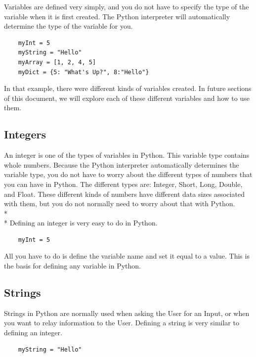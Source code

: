 \documentclass[12pt, letterpaper]{article}
\begin{document}
    Variables are defined very simply, and you do not have to specify the type of the variable when it is first created. The Python interpreter will automatically determine the type of the variable for you.

    \begin{verbatim}
    myInt = 5
    myString = "Hello"
    myArray = [1, 2, 4, 5]
    myDict = {5: "What's Up?", 8:"Hello"}
    \end{verbatim}

    In that example, there were different kinds of variables created. In future sections of this document, we will explore each of these different variables and how to use them.

    \subsection{Integers} \label{integers}

    An integer is one of the types of variables in Python. This variable type contains whole numbers. Because the Python interpreter automatically determines the variable type, you do not have to worry about the different types of numbers that you can have in Python. The different types are: Integer, Short, Long, Double, and Float. These different kinds of numbers have different data sizes associated with them, but you do not normally need to worry about that with Python. \\*\\*
    Defining an integer is very easy to do in Python.

    \begin{verbatim}
    myInt = 5
    \end{verbatim}

    All you have to do is define the variable name and set it equal to a value. This is the basis for defining any variable in Python.

    \subsection{Strings} \label{strings}

    Strings in Python are normally used when asking the User for an Input, or when you want to relay information to the User. Defining a string is very similar to defining an integer.

    \begin{verbatim}
    myString = "Hello"
    \end{verbatim}
\end{document}
